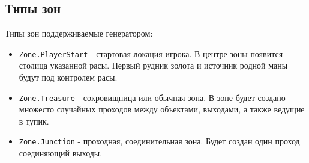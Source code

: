 \subsection{Типы зон}
\label{zoneTypes}
Типы зон поддерживаемые генератором:
\begin{itemize}
\item \texttt{Zone.PlayerStart} - стартовая локация игрока. В центре зоны появится столица указанной расы. Первый рудник золота и источник родной маны будут под контролем расы.
\item \texttt{Zone.Treasure} - сокровищница или обычная зона. В зоне будет создано множесто случайных проходов между объектами, выходами, а также ведущие в тупик.
\item \texttt{Zone.Junction} - проходная, соединительная зона. Будет создан один проход соединяющий выходы.
\end{itemize}